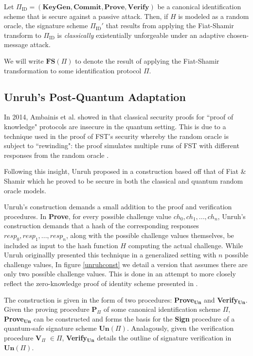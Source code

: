 \begin{tcolorbox}
\begin{theorem}
\label{thm:fiatshamir}
Let $\Pi_{\text{ID}} = (\textbf{KeyGen}, \textbf{Commit}, \textbf{Prove}, \textbf{Verify})$ be a canonical identification scheme that is secure against a passive attack. Then, if $H$ is modeled as a random oracle, the signature scheme $\Pi_{\text{ID}}'$ that results from applying the Fiat-Shamir transform to $\Pi_{\text{ID}}$ is \emph{classically} existentially unforgeable under an adaptive chosen-message attack.
\end{theorem}
\end{tcolorbox}

We will write $\textbf{FS}(\Pi)$ to denote the result of applying the Fiat-Shamir transformation to some identification protocol $\Pi$.

\subsection{Unruh's Post-Quantum Adaptation}

In 2014, Ambainis et al. showed in \cite{rewinding} that classical security proofs for ``proof of knowledge" protocols are insecure in the quantum setting. This is due to a technique used in the proof of FST's security whereby the random oracle is subject to ``rewinding": the proof simulates multiple runs of FST with different responses from the random oracle \cite{rewinding}.

Following this insight, Unruh proposed in \cite{unruh} a construction based off that of Fiat \& Shamir which he proved to be secure in both the classical and quantum random oracle models.

Unruh's construction demands a small addition to the proof and verification procedures. In \textbf{Prove}, for every possible challenge value $ch_0, ch_1, ... , ch_n$, Unruh's construction demands that a hash of the corresponding responses $resp_0, resp_1, ... , resp_n$, along with the possible challenge values themselves, be included as input to the hash function $H$ computing the actual challenge. While Unruh originallly presented this technique in a generalized setting with $n$ possible challenge values, In figure \ref{unruhconst} we detail a version that assumes there are only two possible challenge values. This is done in an attempt to more closely reflect the zero-knowledge proof of identity scheme presented in \cite{djp}.

The construction is given in the form of two procedures: \textbf{Prove}$_{\textbf{Un}}$ and \textbf{Verify}$_{\textbf{Un}}$. Given the proving procedure \textbf{P}$_{\Pi}$ of some canonical identification scheme $\Pi$, \textbf{Prove}$_{\textbf{Un}}$ can be constructed and forms the basis for the \textbf{Sign} procedure of a quantum-safe signature scheme $\textbf{Un}(\Pi)$. Analagously, given the verification procedure \textbf{V}$_{\Pi}$ $\in \Pi$, \textbf{Verify}$_{\textbf{Un}}$ details the outline of signature verification in $\textbf{Un}(\Pi)$.

